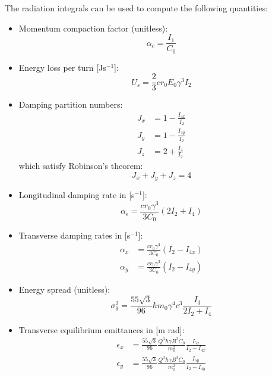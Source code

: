 The radiation integrals can be used to compute the following quantities:
\begin{itemize}
    \item Momentum compaction factor (unitless):
    \begin{equation}
        \alpha_c = \frac{I_1}{C_0}
    \end{equation}

    \item Energy loss per turn [Js$^{-1}$]:
    \begin{equation}
        U_s = \frac{2}{3} c r_0 E_0 \gamma^3 I_2
    \end{equation}

    \item Damping partition numbers:
    \begin{align}
        J_x &= 1 - \frac{I_{4x}}{I_2}\\
        J_y &= 1 - \frac{I_{4y}}{I_2}\\
        J_z &= 2 + \frac{I_4}{I_2}
    \end{align}
    which satisfy Robinson's theorem:
    \begin{equation}
        J_x + J_y + J_z = 4
    \end{equation}

    \item Longitudinal damping rate in [s$^{-1}$]:
    \begin{equation}
        \alpha_\epsilon = \frac{c r_0 \gamma^3}{3 C_0} (2I_2 + I_4)
    \end{equation}

    \item Transverse damping rates in [s$^{-1}$]:
    \begin{align}
        \alpha_x &= \frac{c r_0 \gamma^3}{3C_0} (I_2 - I_{4x})\\
        \alpha_y &= \frac{c r_0 \gamma^3}{3C_0} (I_2 - I_{4y})
    \end{align}

    \item Energy spread (unitless):
    \begin{equation}
        \sigma_\delta^2 = \frac{55 \sqrt{3}}{96} \hbar m_0 \gamma^4 c^3 \frac{I_3}{2I_2 + I_4}
    \end{equation}

    \item Transverse equilibrium emittances in [m rad]:
    \begin{align}
        {\epsilon_x} &= \frac{55 \sqrt{3}}{96} \frac{Q^3 \hbar \gamma B^3 C_0}{m_0^2} \frac{I_{5x}}{I_2 - I_{4x}}\\
        {\epsilon_y} &= \frac{55 \sqrt{3}}{96} \frac{Q^3 \hbar \gamma B^3 C_0}{m_0^2} \frac{I_{5y}}{I_2 - I_{4y}}
    \end{align}


\end{itemize}

